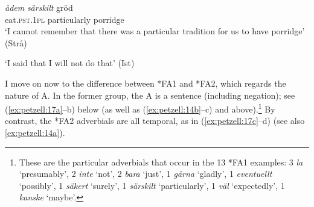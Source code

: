 \documentclass[output=paper,colorlinks,citecolor=brown,draft,draftmode]{langscibook}
\begin{document}
\ea\label{ex:petzell:15}

\gll \textit{ådem} \textit{särskilt}      gröd   \\
     eat.\textsc{pst}.1\textsc{pl}    particularly    porridge\\
\glt `I cannot remember that there was a particular tradition for us to have porridge’ (Strå)  \\


\glt `I said that I will not do that’ (Ist)
\z
\z

\ea\label{ex:petzell:16}
    

\z
\z


I move on now to the difference between *FA1 and *FA2, which regards the nature of A. In the former group, the A is a sentence  (including negation); see (\ref{ex:petzell:17a}–b) below (as well as (\ref{ex:petzell:14b}–c) and  above).\footnote{These are the particular adverbials that occur in the 13 *FA1 examples: 3 \textit{la} `presumably’, 2 \textit{inte} ‘not’, 2 \textit{bara} ‘just’, 1 \textit{gärna} ‘gladly’, 1 \textit{eventuellt} ‘possibly’, 1 \textit{säkert} ‘surely’, 1 \textit{särskilt} ‘particularly’, 1 \textit{väl} ‘expectedly’, 1 \textit{kanske} ‘maybe’.} By contrast, the *FA2 adverbials are all temporal, as in (\ref{ex:petzell:17c}–d) (see also \ref{ex:petzell:14a}).{}
\end{document}
